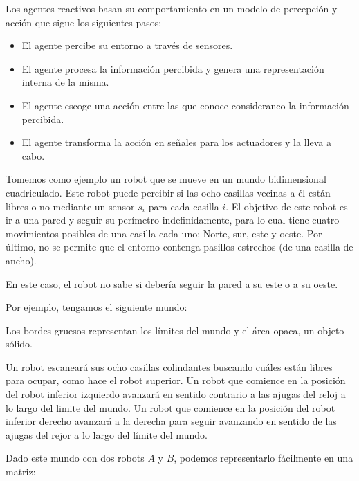 Los agentes reactivos basan su comportamiento en un modelo de percepción y acción que sigue los siguientes pasos:

\begin{itemize}
	\item El agente percibe su entorno a través de sensores.
	\item El agente procesa la información percibida y genera una representación interna de la misma.
	\item El agente escoge una acción entre las que conoce consideranco la información percibida.
	\item El agente transforma la acción en señales para los actuadores y la lleva a cabo.
\end{itemize}

Tomemos como ejemplo un robot que se mueve en un mundo bidimensional cuadriculado.
Este robot puede percibir si las ocho casillas vecinas a él están libres o no mediante un sensor $s_i$ para cada casilla $i$.
El objetivo de este robot es ir a una pared y seguir su perímetro indefinidamente, para lo cual tiene cuatro movimientos posibles de una casilla cada uno: Norte, sur, este y oeste.
Por último, no se permite que el entorno contenga pasillos estrechos (de una casilla de ancho).

\begin{center}


En este caso, el robot no sabe si debería seguir la pared a su este o a su oeste.
\end{center}

Por ejemplo, tengamos el siguiente mundo:

\begin{center}


Los bordes gruesos representan los límites del mundo y el área opaca, un objeto sólido.
\end{center}

Un robot escaneará sus ocho casillas colindantes buscando cuáles están libres para ocupar, como hace el robot superior.
Un robot que comience en la posición del robot inferior izquierdo avanzará en sentido contrario a las ajugas del reloj a lo largo del limite del mundo.
Un robot que comience en la posición del robot inferior derecho avanzará a la derecha para seguir avanzando en sentido de las ajugas del rejor a lo largo del límite del mundo.

Dado este mundo con dos robots $A$ y $B$, podemos representarlo fácilmente en una matriz:

